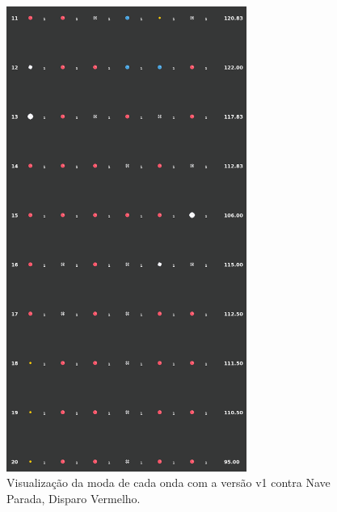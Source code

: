 \begin{figure}[H]
  \centering
  \includegraphics[width=0.7\textwidth]{figuras/ss/ss_redstill_ai_mode_1_2.png}
  \caption{Visualização da moda de cada onda com a versão v1 contra Nave Parada, Disparo Vermelho.}
  \label{fig:ss-moda-rs-1-2}
\end{figure}

